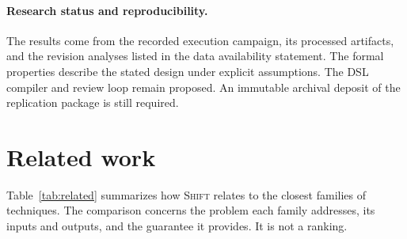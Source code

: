 \documentclass[a4paper,fleqn]{cas-sc}
\newcommand{\tool}{\textsc{Shift}}
\begin{document}
\paragraph{Research status and reproducibility.}
The results come from the recorded execution campaign, its processed artifacts, and the revision analyses listed in the data availability statement. The formal properties describe the stated design under explicit assumptions. The DSL compiler and review loop remain proposed. An immutable archival deposit of the replication package is still required.

\section{Related work}\label{sec:related}

Table~\ref{tab:related} summarizes how \tool{} relates to the closest families of techniques. The comparison concerns the problem each family addresses, its inputs and outputs, and the guarantee it provides. It is not a ranking.
\end{document}
